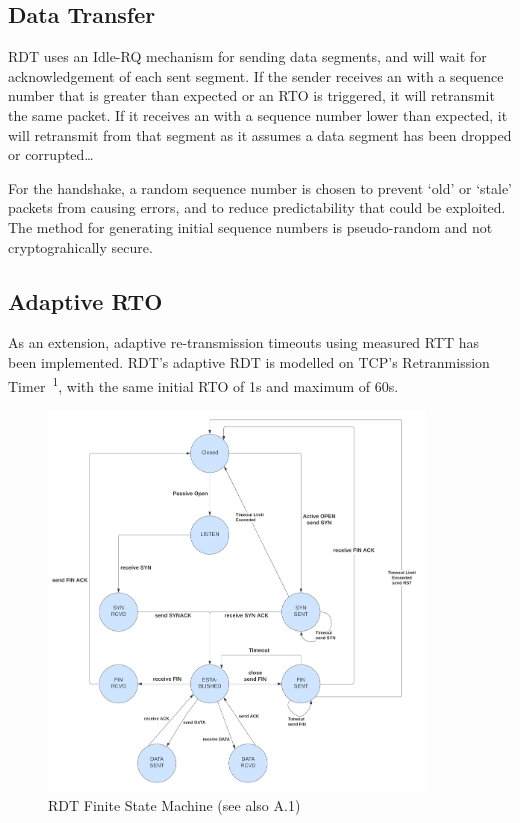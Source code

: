 \subsection{Data Transfer}

RDT uses an Idle-RQ mechanism for sending data segments, and will wait for acknowledgement of each sent segment. If the sender receives an  with a sequence number that is greater than expected or an RTO is triggered, it will retransmit the same packet. If it receives an  with a sequence number lower than expected, it will retransmit from that segment as it assumes a data segment has been dropped or corrupted\dots

For the handshake, a random sequence number is chosen to prevent `old' or `stale' packets from causing errors, and to reduce predictability that could be exploited. The method for generating initial sequence numbers is pseudo-random and not cryptograhically secure. 

\subsection{Adaptive RTO}\label{sec:RTO}
As an extension, adaptive re-transmission timeouts using measured RTT has been implemented. RDT's adaptive RDT is modelled on TCP's Retranmission Timer~\cite{rfc6298}\textsuperscript{1}, with the same initial RTO of 1s and maximum of 60s.

\begin{figure}[H]
\begin{center}
    \includegraphics[width=100mm]{images/fsm.png}
\end{center}
\caption{RDT Finite State Machine (see also A.1)}\label{fig:fsm}
\end{figure}

